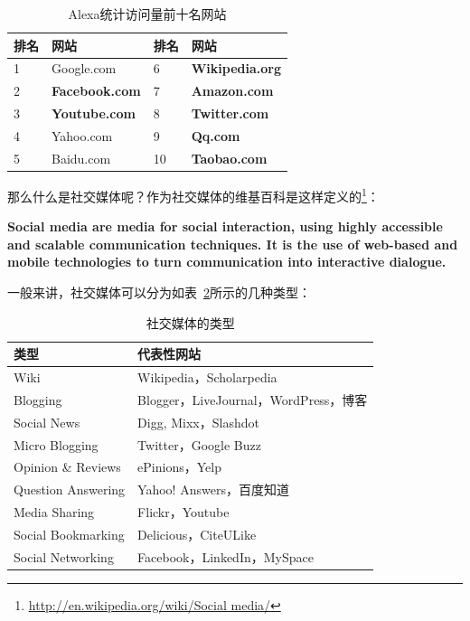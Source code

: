 \begin{table}[htp]
\centering
\caption{Alexa统计访问量前十名网站}
\label{Alexa_top10}
 \begin{tabular}{|l|l|l|l|}
 \hline
 排名&网站&排名&网站\\
 \hline
 1& Google.com& 6&\textbf{ Wikipedia.org}\\
 2& \textbf{Facebook.com}& 7& \textbf{Amazon.com}\\
 3& \textbf{Youtube.com}& 8& \textbf{Twitter.com}\\
 4& Yahoo.com& 9& \textbf{Qq.com}\\
 5& Baidu.com& 10& \textbf{Taobao.com}\\
 \hline
\end{tabular}
\end{table}

那么什么是社交媒体呢？作为社交媒体的维基百科是这样定义的\footnote{\url{http://en.wikipedia.org/wiki/Social media/}}：

\textbf{Social media are media for social interaction, using highly accessible and scalable communication techniques. It is the use of web-based and mobile technologies to turn communication into interactive dialogue.}

一般来讲，社交媒体可以分为如表~\ref{media_type}所示的几种类型：

\begin{table}[htp]
\centering
\caption{社交媒体的类型}
\label{media_type}
 \begin{tabular}{|l|l|}
 \hline
 类型& 代表性网站\\
 \hline
 Wiki & Wikipedia，Scholarpedia\\
 \hline
 Blogging & Blogger，LiveJournal，WordPress，博客\\
 \hline
 Social News & Digg, Mixx，Slashdot\\
 \hline
 Micro Blogging & Twitter，Google Buzz\\
 \hline
 Opinion \& Reviews & ePinions，Yelp\\
 \hline
 Question Answering & Yahoo! Answers，百度知道\\
 \hline
 Media Sharing & Flickr，Youtube\\
 \hline
 Social Bookmarking & Delicious，CiteULike\\
 \hline
 Social Networking & Facebook，LinkedIn，MySpace\\
 \hline
\end{tabular}
\end{table}

